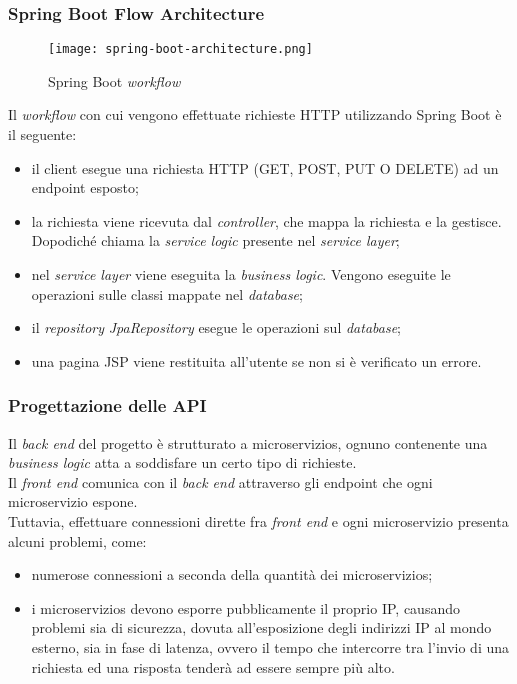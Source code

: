 \subsubsection{Spring Boot Flow Architecture}
\begin{figure}[H]
    \centering
    \texttt{[image: spring-boot-architecture.png]}
    \caption{Spring Boot \textit{workflow}}
\end{figure}
Il \textit{workflow} con cui vengono effettuate richieste HTTP utilizzando
Spring Boot è il seguente:
\begin{itemize}
    \item il client esegue una richiesta HTTP (GET, POST, PUT O DELETE) ad un
          \gls{endpoint} esposto;
    \item la richiesta viene ricevuta dal \textit{controller}, che mappa la
          richiesta e la gestisce. Dopodiché chiama la \textit{service logic}
          presente
          nel \textit{service layer};
    \item nel \textit{service layer} viene eseguita la \textit{business logic}.
          Vengono eseguite le operazioni sulle classi mappate nel
          \textit{database};
    \item il \textit{repository} \textit{JpaRepository} esegue le operazioni
          sul \textit{database};
    \item una pagina \gls{JSP} viene restituita all'utente se non si è
          verificato un errore. \cite{site-microservizi}
\end{itemize}

\subsubsection{Progettazione delle API}
Il \textit{back end} del progetto è strutturato a \glspl{microservizio}, ognuno
contenente una \textit{business logic} atta a soddisfare un certo tipo di
richieste.\\
Il \textit{front end} comunica con il \textit{back end} attraverso gli
\gls{endpoint} che ogni \gls{microservizio} espone. \\
Tuttavia, effettuare connessioni dirette fra \textit{front end} e ogni
\gls{microservizio} presenta alcuni problemi, come:
\begin{itemize}
    \item numerose connessioni a seconda della quantità dei
          \glspl{microservizio};
    \item i \glspl{microservizio} devono esporre pubblicamente il proprio
          \gls{IP}, causando problemi sia di sicurezza, dovuta all'esposizione
          degli
          indirizzi \gls{IP} al mondo esterno, sia in fase di latenza, ovvero
          il tempo
          che intercorre tra l'invio di una richiesta ed una risposta tenderà
          ad essere
          sempre più alto. \cite{site-api-gateway}
\end{itemize}

